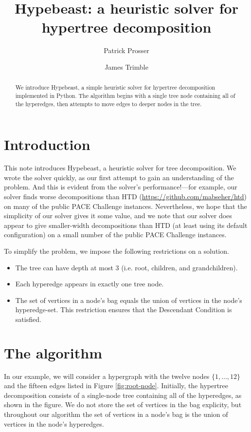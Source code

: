 \documentclass[a4paper,UKenglish,cleveref, autoref]{lipics-v2019}
\title{Hypebeast: a heuristic solver for hypertree decomposition}
\author{Patrick Prosser}{University of Glasgow, Scotland}{patrick.prosser@glasgow.ac.uk}{https://orcid.org/0000-0003-4460-6912}{}
\author{James Trimble}{University of Glasgow, Scotland}{j.trimble.1@research.gla.ac.uk}{https://orcid.org/0000-0001-7282-8745}{}
\begin{document}
\maketitle

\begin{abstract}
We introduce Hypebeast, a simple heuristic solver for hypertree decomposition implemented in Python.  The algorithm begins with a single tree node containing all of the hyperedges, then attempts to move edges to deeper nodes in the tree.
\end{abstract}

\section{Introduction}

This note introduces Hypebeast, a heuristic solver for tree decomposition.  We wrote the solver quickly, as our first attempt to gain an understanding of the problem.  And this is evident from the solver's performance!---for example, our solver finds worse decompositions than HTD (\url{https://github.com/mabseher/htd}) on many of the public PACE Challenge instances.  Nevertheless, we hope that the simplicity of our solver gives it some value, and we note that our solver does appear to give smaller-width decompositions than HTD (at least using its default configuration) on a small number of the public PACE Challenge instances.

To simplify the problem, we impose the following restrictions on a solution.
\begin{itemize}
  \item The tree can have depth at most 3 (i.e. root, children, and grandchildren).
  \item Each hyperedge appears in exactly one tree node.
  \item The set of vertices in a node's bag equals the union of vertices in the node's hyperedge-set.  This restriction ensures that the Descendant Condition is satisfied.
\end{itemize}

\section{The algorithm}

In our example, we will consider a hypergraph with the twelve nodes $\{1, \dots, 12\}$ and the fifteen edges listed in Figure \ref{fig:root-node}.  Initially, the hypertree decomposition consists of a single-node tree containing all of the hyperedges, as shown in the figure.  We do not store the set of vertices in the bag explicity, but throughout our algorithm the set of vertices in a node's bag is the union of vertices in the node's hyperedges.
\end{document}
